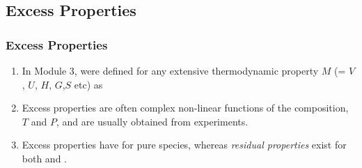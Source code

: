 \documentclass[10pt,compress,unknownkeysallowed]{beamer}
\begin{document}
\subsection{Excess Properties}

\begin{frame}
  \frametitle{Excess Properties}
  \begin{enumerate}%
      \item<1-> In Module 3,  were defined for any extensive thermodynamic property $M$ (= $V$, $U$, $H$, $G$,$S$ etc) as
      \item<2-> Excess properties are often complex non-linear functions of the composition, $T$ and $P$, and are usually obtained from experiments.
      \item<3-> Excess properties have  for pure species, whereas {\it residual properties} exist for both  and .
  \end{enumerate}
\end{frame}
\normalsize
\end{document}
